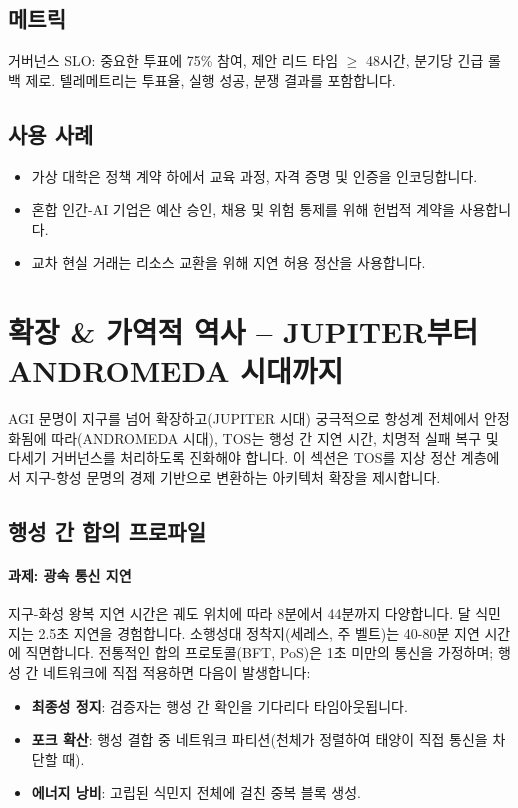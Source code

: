 \documentclass[11pt]{article}
\begin{document}
\subsection{메트릭}
거버넌스 SLO: 중요한 투표에 75\% 참여, 제안 리드 타임 $\geq$ 48시간, 분기당 긴급 롤백 제로. 텔레메트리는 투표율, 실행 성공, 분쟁 결과를 포함합니다.

\subsection{사용 사례}
\begin{itemize}[noitemsep]
  \item 가상 대학은 정책 계약 하에서 교육 과정, 자격 증명 및 인증을 인코딩합니다.
  \item 혼합 인간-AI 기업은 예산 승인, 채용 및 위험 통제를 위해 헌법적 계약을 사용합니다.
  \item 교차 현실 거래는 리소스 교환을 위해 지연 허용 정산을 사용합니다.
\end{itemize}

\section{확장 \& 가역적 역사 -- JUPITER부터 ANDROMEDA 시대까지}
\label{sec:expansion}

AGI 문명이 지구를 넘어 확장하고(JUPITER 시대) 궁극적으로 항성계 전체에서 안정화됨에 따라(ANDROMEDA 시대), TOS는 행성 간 지연 시간, 치명적 실패 복구 및 다세기 거버넌스를 처리하도록 진화해야 합니다. 이 섹션은 TOS를 지상 정산 계층에서 지구-항성 문명의 경제 기반으로 변환하는 아키텍처 확장을 제시합니다.

\subsection{행성 간 합의 프로파일}

\paragraph{과제: 광속 통신 지연}
지구-화성 왕복 지연 시간은 궤도 위치에 따라 8분에서 44분까지 다양합니다. 달 식민지는 2.5초 지연을 경험합니다. 소행성대 정착지(세레스, 주 벨트)는 40-80분 지연 시간에 직면합니다. 전통적인 합의 프로토콜(BFT, PoS)은 1초 미만의 통신을 가정하며; 행성 간 네트워크에 직접 적용하면 다음이 발생합니다:
\begin{itemize}[noitemsep]
  \item \textbf{최종성 정지}: 검증자는 행성 간 확인을 기다리다 타임아웃됩니다.
  \item \textbf{포크 확산}: 행성 결합 중 네트워크 파티션(천체가 정렬하여 태양이 직접 통신을 차단할 때).
  \item \textbf{에너지 낭비}: 고립된 식민지 전체에 걸친 중복 블록 생성.
\end{itemize}
\end{document}
